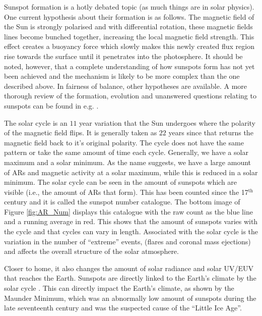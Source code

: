     Sunspot formation is a hotly debated topic (as much things are in solar physics).
    One current hypothesis about their formation is as follows.
    The magnetic field of the Sun is strongly polarised and with differential rotation, these magnetic fields lines become bunched together, increasing the local magnetic field strength.
    This effect creates a buoyancy force which slowly makes this newly created flux region rise towards the surface until it penetrates into the photosphere.
    It should be noted, however, that a complete understanding of how sunspots form has not yet been achieved and the mechanism is likely to be more complex than the one described above.
    In fairness of balance, other hypotheses are available.
    A more thorough review of the formation, evolution and unanswered questions relating to sunspots can be found in e.g. \cite{SAO}.
    
    The solar cycle is an $11$ year variation that the Sun undergoes where the polarity of the magnetic field flips.
    It is generally taken as $22$ years since that returns the magnetic field back to it's original polarity.
    The cycle does not have the same pattern or take the same amount of time each cycle.
    Generally, we have a solar maximum and a solar minimum.
    As the name suggests, we have a large amount of ARs and magnetic activity at a solar maximum, while this is reduced in a solar minimum.
    The solar cycle can be seen in the amount of sunspots which are visible (i.e., the amount of ARs that form).
    This has been counted since the 17$^{\mathrm{th}}$ century and it is called the sunspot number catalogue.
    The bottom image of Figure \ref{fig:AR_Num} displays this catalogue with the raw count as the blue line and a running average in red.
    This shows that the amount of sunspots varies with the cycle and that cycles can vary in length.
    Associated with the solar cycle is the variation in the number of ``extreme'' events, (flares and coronal mass ejections) and affects the overall structure of the solar atmosphere.
        
    Closer to home, it also changes the amount of solar radiance and solar UV/EUV that reaches the Earth.
    Sunspots are directly linked to the Earth's climate by the solar cycle \citep{FRIIS-CHRISTENSEN01111991}.
    This can directly impact the Earth's climate, as shown by the Maunder Minimum, which was an abnormally low amount of sunspots during the late seventeenth century and was the suspected cause of the ``Little Ice Age''.
   
